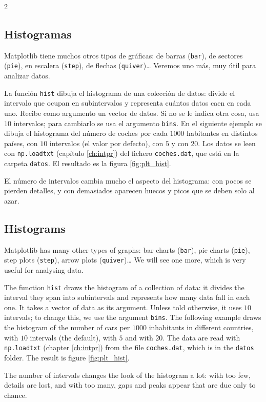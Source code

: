 \begin{paracol}{2}
    \subsection{Histogramas}
    Matplotlib tiene muchos otros tipos de gráficas: de barras (\texttt{bar}), de sectores (\texttt{pie}), en escalera (\texttt{step}), de flechas (\texttt{quiver})… Veremos uno más, muy útil para analizar datos.

    La función \texttt{hist} dibuja el histograma de una colección de datos: divide el intervalo que ocupan en subintervalos y representa cuántos datos caen en cada uno. Recibe como argumento un vector de datos. Si no se le indica otra cosa, usa $10$ intervalos; para cambiarlo se usa el argumento \texttt{bins}. En el siguiente ejemplo se dibuja el histograma del número de coches por cada $1000$ habitantes en distintos países, con $10$ intervalos (el valor por defecto), con $5$ y con $20$. Los datos se leen con \texttt{np.loadtxt} (capítulo \ref{ch:intpr}) del fichero \texttt{coches.dat}, que está en la carpeta \texttt{datos}. El resultado es la figura \ref{fig:plt_hist}.

    El número de intervalos cambia mucho el aspecto del histograma: con pocos se pierden detalles, y con demasiados aparecen huecos y picos que se deben solo al azar.
    \switchcolumn
    \subsection{Histograms}
    Matplotlib has many other types of graphs: bar charts (\texttt{bar}), pie charts (\texttt{pie}), step plots (\texttt{step}), arrow plots (\texttt{quiver})… We will see one more, which is very useful for analysing data.

    The function \texttt{hist} draws the histogram of a collection of data: it divides the interval they span into subintervals and represents how many data fall in each one. It takes a vector of data as its argument. Unless told otherwise, it uses $10$ intervals; to change this, we use the argument \texttt{bins}. The following example draws the histogram of the number of cars per $1000$ inhabitants in different countries, with $10$ intervals (the default), with $5$ and with $20$. The data are read with \texttt{np.loadtxt} (chapter \ref{ch:intpr}) from the file \texttt{coches.dat}, which is in the \texttt{datos} folder. The result is figure \ref{fig:plt_hist}.

    The number of intervals changes the look of the histogram a lot: with too few, details are lost, and with too many, gaps and peaks appear that are due only to chance.
\end{paracol}

